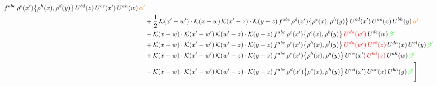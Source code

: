 \documentclass[9pt]{article}
\numberwithin{equation}{section}
\begin{document}
\begin{align}
f^{abc}\,\rho^{e}(x')\big\{\rho^{h}(x),\rho^{d}(y)\big\}\,U^{bd}(z)\,U^{ce}(x')\,U^{ah}(w)\,{\color{orange}\alpha'}\notag \\ & +\frac{1}{2}\,\mathcal{K}(x'-w')\cdot\mathcal{K}(x-w)\,\mathcal{K}(x'-z)\cdot\mathcal{K}(y-z)\, f^{abc}\,\rho^{d}(x')\big\{\rho^{e}(x),\rho^{h}(y)\big\}\,U^{cd}(x')\,U^{ae}(x)\,U^{bh}(y)\,{\color{orange}\alpha'}\notag \\ & -\mathcal{K}(x-w)\cdot\mathcal{K}(x'-w')\,\mathcal{K}(w'-z)\cdot\mathcal{K}(y-z)\, f^{abc}\,\rho^{c}(x')\big\{\rho^{e}(x),\rho^{b}(y)\big\}\,{\color{red}U^{da}(w')}\,U^{de}(w)\,{\color{green}\beta'}\notag \\ & +\mathcal{K}(x-w)\cdot\mathcal{K}(x'-w')\,\mathcal{K}(w'-z)\cdot\mathcal{K}(y-z)\, f^{abc}\,\rho^{c}(x')\big\{\rho^{h}(x),\rho^{l}(y)\big\}\,{\color{red}U^{da}(w')}\,{\color{red}U^{eb}(z)}\,U^{dh}(x)\,U^{el}(y)\,{\color{green}\beta'}\notag\\ &+\mathcal{K}(x-w)\cdot\mathcal{K}(x'-w')\,\mathcal{K}(w'-z)\cdot\mathcal{K}(y-z)\, f^{abc}\,\rho^{e}(x')\big\{\rho^{h}(x),\rho^{d}(y)\big\}\,U^{ce}(x')\,{\color{red}U^{bd}(z)}\,U^{ah}(w)\,{\color{green}\beta'}\notag \\ &-\mathcal{K}(x-w)\cdot\mathcal{K}(x'-w')\,\mathcal{K}(w'-z)\cdot\mathcal{K}(y-z)\, f^{abc}\,\rho^{d}(x')\big\{\rho^{e}(x),\rho^{h}(y)\big\}\,U^{cd}(x')\,U^{ae}(x)\,U^{bh}(y)\,{\color{green}\beta'}\Bigg]
\end{align}
\end{document}
